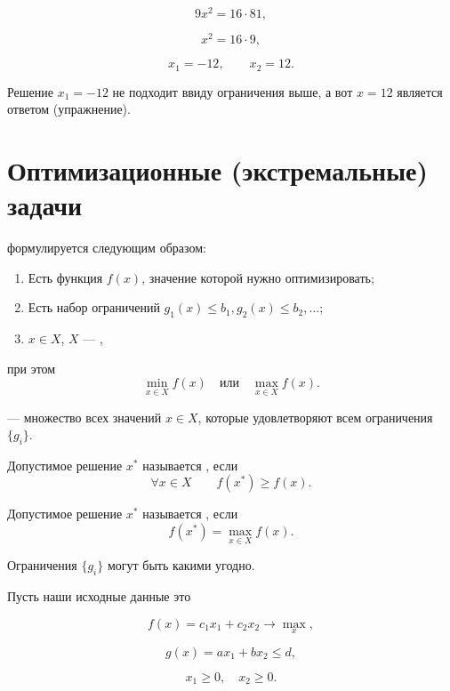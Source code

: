 \[9x^2 = 16 \cdot 81,\]

\[x^2 = 16 \cdot 9,\]

\[x_1 = -12, \qquad x_2 = 12.\]

Решение $x_1 = -12$ не подходит ввиду ограничения выше, а вот $\boxed{x = 12}$ является ответом (упражнение).

\chapter{Оптимизационные (экстремальные) задачи}


 формулируется следующим образом:

\begin{enumerate}[nosep]
	\item Есть функция $f(x)$, значение которой нужно оптимизировать;
	
	\item Есть набор ограничений $g_1(x) \le b_1, g_2(x) \le b_2, \dots$;
	
	\item $x \in X$, $X$ --- ,
\end{enumerate}

при этом 
\[\min_{x \in X} f(x) \quad \text{или} \quad \max_{x \in X} f(x).\]


 --- множество всех значений $x \in X$, которые удовлетворяют всем ограничения $\{g_i\}$.


Допустимое решение $x^*$ называется , если
\[
	\forall x \in X \qquad f(x^*) \ge f(x).	
\]


Допустимое решение $x^*$ называется , если
\[
	f(x^*) = \max_{x \in X} f(x).	
\]

\remark

Ограничения $\{g_i\}$ могут быть какими угодно.

\example

Пусть наши исходные данные это

\[f(x) = c_1 x_1 + c_2 x_2 \to \max_x,\]

\[g(x) = ax_1 + bx_2 \le d,\]

\[x_1 \ge 0, \quad x_2 \ge 0.\]


